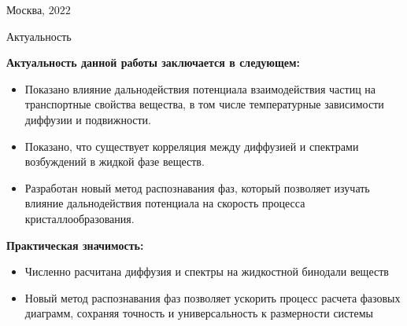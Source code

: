 \documentclass{beamer}
\begin{document}
\begin{frame}
\begin{columns}
\begin{column}{0.50\textwidth}
\end{column}
\end{columns}


\vspace{0.5cm}
\begin{center}
\tiny Москва, $2022$
\end{center}
\end{frame}










\begin{frame}{Актуальность}
\footnotesize{

\textbf{Актуальность данной работы заключается в следующем:}
\begin{itemize}
    \item Показано влияние дальнодействия потенциала взаимодействия частиц на транспортные свойства вещества, в том числе температурные зависимости диффузии и подвижности.
    \item Показано, что существует корреляция между диффузией и спектрами возбуждений в жидкой фазе веществ.
    \item Разработан новый метод распознавания фаз, который позволяет изучать влияние дальнодействия потенциала на скорость процесса кристаллообразования.

\end{itemize}

\textbf{Практическая значимость:}

\begin{itemize}
 \item Численно расчитана диффузия и спектры на жидкостной бинодали веществ
 \item Новый метод распознавания фаз позволяет ускорить процесс расчета фазовых диаграмм, сохраняя точность и универсальность к размерности системы
\end{itemize}


}
\end{frame}
\end{document}
